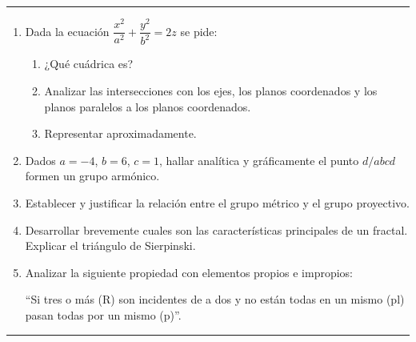 \documentclass[9pt,a4paper]{extarticle}
\begin{document}
\hrule
{}
\begin{enumerate}
    \item Dada la ecuación $\dfrac{x^2}{a^2} + \dfrac{y^2}{b^2}=2z $ se pide:
    \begin{enumerate}
        \item ¿Qué cuádrica es?
        \item Analizar las intersecciones con los ejes, los planos coordenados y los planos paralelos a los planos coordenados.
        \item Representar aproximadamente.
    \end{enumerate}
    
    \item Dados $a =-4$, $b=6$, $c=1$, hallar analítica y gráficamente el punto $d / abcd$ formen un grupo armónico.

\item Establecer y justificar la relación entre el grupo métrico y el grupo proyectivo.

\item Desarrollar brevemente cuales son las características principales de un fractal. Explicar el triángulo de Sierpinski.

\item Analizar la siguiente propiedad con elementos propios e impropios:

“Si tres o más (R) son incidentes de a dos y no están todas en un mismo (pl) pasan todas por un mismo (p)”.

\end{enumerate}
\hrule

\end{document}

